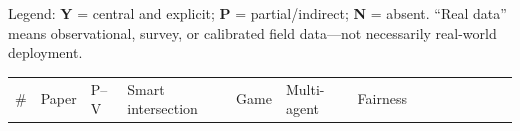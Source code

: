 \documentclass[
  english,
  11pt,
  a4paper,
]{article}
\newcounter{none} %
\begin{document}
Legend: \textbf{Y} = central and explicit; \textbf{P} =
partial/indirect; \textbf{N} = absent. ``Real data'' means
observational, survey, or calibrated field data---not necessarily
real-world deployment.

\begin{landscape}
{\def\LTcaptype{none} %
\scriptsize
\setlength{\tabcolsep}{2pt}
\begin{longtable}[]{@{}
  >{\raggedleft\arraybackslash}p{}
  >{\raggedright\arraybackslash}p{}
  >{\centering\arraybackslash}p{}
  >{\centering\arraybackslash}p{}
  >{\centering\arraybackslash}p{}
  >{\centering\arraybackslash}p{}
  >{\centering\arraybackslash}p{}
  >{\centering\arraybackslash}p{}
  >{\centering\arraybackslash}p{}
  >{\centering\arraybackslash}p{}
  >{\centering\arraybackslash}p{}
  >{\centering\arraybackslash}p{}
  >{\raggedright\arraybackslash}p{}
  >{\raggedright\arraybackslash}p{}@{}}
\toprule\noalign{}
\begin{minipage}[b]{\linewidth}\raggedleft
\#
\end{minipage} & \begin{minipage}[b]{\linewidth}\raggedright
Paper
\end{minipage} & \begin{minipage}[b]{\linewidth}\centering
P--V
\end{minipage} & \begin{minipage}[b]{\linewidth}\centering
Smart intersection
\end{minipage} & \begin{minipage}[b]{\linewidth}\centering
Game
\end{minipage} & \begin{minipage}[b]{\linewidth}\centering
Multi-agent
\end{minipage} & \begin{minipage}[b]{\linewidth}\centering
Fairness
\end{minipage} & \begin{minipage}[b]{\linewidth}\centering

\end{minipage}
\end{longtable}}
\end{landscape}
\end{document}
